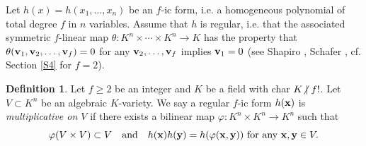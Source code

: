 \documentclass[a4paper, 11pt]{amsart}
\newcommand{\notmid}{\mathrel{\ooalign{$\mkern-5mu\not$\crcr$|$}}}
\theoremstyle{plain}
\theoremstyle{definition}
\newtheorem{defn}[thm]{Definition}
\numberwithin{equation}{section}
\begin{document}
Let $h(x)=h(x_1,\dots,x_n)$ be an $f$-ic form, i.e. a homogeneous polynomial of total degree $f$ in $n$ variables. 
Assume that $h$ is regular, i.e. that the associated symmetric $f$-linear map $\theta:K^n\times\cdots\times K^n\to K$ has the property that $\theta({\bf v}_1,{\bf v}_2,\dots,{\bf v}_f)=0$ for any ${\bf v}_2,\dots, {\bf v}_f$ implies ${\bf v}_1=0$
(see Shapiro \cite[Chapter 16]{Sha00}, Schafer \cite{Sch70}, cf. Section \ref{S4} for $f=2$).

\begin{defn}
Let $f \geq 2$ be an integer and $K$ be a field with char $K\notmid f!$.  
Let $V \subset K^n$ be an algebraic $K$-variety. 
We say a regular $f$-ic form $h({\bf x})$ is {\it multiplicative on $V$} 
if there exists a bilinear map 
$\varphi :K^n \times K^n \rightarrow K^n$ such that
\[
\varphi(V \times V) \subset V \quad \mbox{and}\quad h({\bf x})h({\bf y})=h(\varphi({\bf x,y}))\mbox{ for any }{\bf x,y} \in V.
\]
\end{defn}
\end{document}
